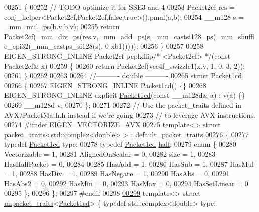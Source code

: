 \begin{DoxyCode}
00251 \{
00252   \textcolor{comment}{// TODO optimize it for SSE3 and 4}
00253   Packet2cf res = conj\_helper<Packet2cf,Packet2cf,false,true>().pmul(a,b);
00254   \_\_m128 s = \_mm\_mul\_ps(b.v,b.v);
00255   \textcolor{keywordflow}{return} Packet2cf(\_mm\_div\_ps(res.v,\_mm\_add\_ps(s,\_mm\_castsi128\_ps(\_mm\_shuffle\_epi32(\_mm\_castps\_si128(s), 0
      xb1)))));
00256 \}
00257 
00258 EIGEN\_STRONG\_INLINE Packet2cf pcplxflip\textcolor{comment}{/* <Packet2cf> */}(\textcolor{keyword}{const} Packet2cf& x)
00259 \{
00260   \textcolor{keywordflow}{return} Packet2cf(vec4f\_swizzle1(x.v, 1, 0, 3, 2));
00261 \}
00262 
00263 
00264 \textcolor{comment}{//---------- double ----------}
\hyperlink{struct_eigen_1_1internal_1_1_packet1cd}{00265} \textcolor{keyword}{struct }\hyperlink{struct_eigen_1_1internal_1_1_packet1cd}{Packet1cd}
00266 \{
00267   EIGEN\_STRONG\_INLINE \hyperlink{struct_eigen_1_1internal_1_1_packet1cd}{Packet1cd}() \{\}
00268   EIGEN\_STRONG\_INLINE \textcolor{keyword}{explicit} \hyperlink{struct_eigen_1_1internal_1_1_packet1cd}{Packet1cd}(\textcolor{keyword}{const} \_\_m128d& a) : v(a) \{\}
00269   \_\_m128d  v;
00270 \};
00271 
00272 \textcolor{comment}{// Use the packet\_traits defined in AVX/PacketMath.h instead if we're going}
00273 \textcolor{comment}{// to leverage AVX instructions.}
00274 \textcolor{preprocessor}{#ifndef EIGEN\_VECTORIZE\_AVX}
00275 \textcolor{keyword}{template}<> \textcolor{keyword}{struct }\hyperlink{struct_eigen_1_1internal_1_1packet__traits}{packet\_traits}<std::\hyperlink{structcomplex}{complex}<double> >  : 
      \hyperlink{struct_eigen_1_1internal_1_1default__packet__traits}{default\_packet\_traits}
00276 \{
00277   \textcolor{keyword}{typedef} \hyperlink{struct_eigen_1_1internal_1_1_packet1cd}{Packet1cd} type;
00278   \textcolor{keyword}{typedef} \hyperlink{struct_eigen_1_1internal_1_1_packet1cd}{Packet1cd} \hyperlink{struct_eigen_1_1half}{half};
00279   \textcolor{keyword}{enum} \{
00280     Vectorizable = 1,
00281     AlignedOnScalar = 0,
00282     size = 1,
00283     HasHalfPacket = 0,
00284 
00285     HasAdd    = 1,
00286     HasSub    = 1,
00287     HasMul    = 1,
00288     HasDiv    = 1,
00289     HasNegate = 1,
00290     HasAbs    = 0,
00291     HasAbs2   = 0,
00292     HasMin    = 0,
00293     HasMax    = 0,
00294     HasSetLinear = 0
00295   \};
00296 \};
00297 \textcolor{preprocessor}{#endif}
00298 
\hyperlink{struct_eigen_1_1internal_1_1unpacket__traits_3_01_packet1cd_01_4}{00299} \textcolor{keyword}{template}<> \textcolor{keyword}{struct }\hyperlink{struct_eigen_1_1internal_1_1unpacket__traits}{unpacket\_traits}<\hyperlink{struct_eigen_1_1internal_1_1_packet1cd}{Packet1cd}> \{ \textcolor{keyword}{typedef} std::complex<double> type; \textcolor{keyword}{
}
\end{DoxyCode}
